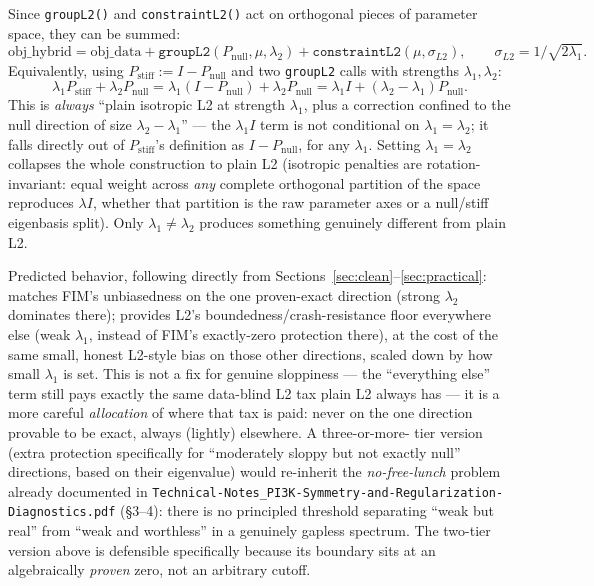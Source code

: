 \documentclass[11pt]{article}
\newcommand{\code}[1]{\texttt{#1}}
\newcommand{\file}[1]{\textcolor{black!60}{\texttt{#1}}}
\begin{document}
Since \code{groupL2()} and \code{constraintL2()} act on orthogonal pieces of
parameter space, they can be summed:
\[
\text{obj\_hybrid} = \text{obj\_data} + \code{groupL2}(P_{\text{null}}, \mu, \lambda_2)
+ \code{constraintL2}(\mu, \sigma_{L2}),\qquad \sigma_{L2}=1/\sqrt{2\lambda_1}.
\]
Equivalently, using $P_{\text{stiff}} := I - P_{\text{null}}$ and two
\code{groupL2} calls with strengths $\lambda_1,\lambda_2$:
\[
\lambda_1 P_{\text{stiff}} + \lambda_2 P_{\text{null}}
= \lambda_1 (I - P_{\text{null}}) + \lambda_2 P_{\text{null}}
= \lambda_1 I + (\lambda_2-\lambda_1) P_{\text{null}}.
\]
This is \emph{always} ``plain isotropic L2 at strength $\lambda_1$, plus a
correction confined to the null direction of size $\lambda_2-\lambda_1$'' ---
the $\lambda_1 I$ term is not conditional on $\lambda_1=\lambda_2$; it falls
directly out of $P_{\text{stiff}}$'s definition as $I-P_{\text{null}}$, for
any $\lambda_1$. Setting $\lambda_1=\lambda_2$ collapses the whole
construction to plain L2 (isotropic penalties are rotation-invariant: equal
weight across \emph{any} complete orthogonal partition of the space
reproduces $\lambda I$, whether that partition is the raw parameter axes or
a null/stiff eigenbasis split). Only $\lambda_1\neq\lambda_2$ produces
something genuinely different from plain L2.

Predicted behavior, following directly from Sections~\ref{sec:clean}--\ref{sec:practical}:
matches FIM's unbiasedness on the one proven-exact direction (strong
$\lambda_2$ dominates there); provides L2's boundedness/crash-resistance
floor everywhere else (weak $\lambda_1$, instead of FIM's exactly-zero
protection there), at the cost of the same small, honest L2-style bias on
those other directions, scaled down by how small $\lambda_1$ is set. This is
not a fix for genuine sloppiness --- the ``everything else'' term still pays
exactly the same data-blind L2 tax plain L2 always has --- it is a more
careful \emph{allocation} of where that tax is paid: never on the one
direction provable to be exact, always (lightly) elsewhere. A three-or-more-
tier version (extra protection specifically for ``moderately sloppy but not
exactly null'' directions, based on their eigenvalue) would re-inherit the
\emph{no-free-lunch} problem already documented in
\file{Technical-Notes\_PI3K-Symmetry-and-Regularization-Diagnostics.pdf}
(\S3--4): there is no principled threshold separating ``weak but real'' from
``weak and worthless'' in a genuinely gapless spectrum. The two-tier version
above is defensible specifically because its boundary sits at an
algebraically \emph{proven} zero, not an arbitrary cutoff.
\end{document}
